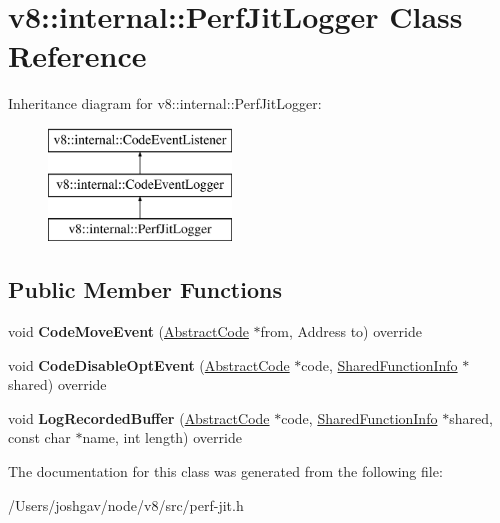 \hypertarget{classv8_1_1internal_1_1_perf_jit_logger}{}\section{v8\+:\+:internal\+:\+:Perf\+Jit\+Logger Class Reference}
\label{classv8_1_1internal_1_1_perf_jit_logger}
Inheritance diagram for v8\+:\+:internal\+:\+:Perf\+Jit\+Logger\+:\begin{figure}[H]
\begin{center}
\leavevmode
\includegraphics[height=3.000000cm]{classv8_1_1internal_1_1_perf_jit_logger}
\end{center}
\end{figure}
\subsection*{Public Member Functions}
\begin{DoxyCompactItemize}
\item 
void {\bfseries Code\+Move\+Event} (\hyperlink{classv8_1_1internal_1_1_abstract_code}{Abstract\+Code} $\ast$from, Address to) override\hypertarget{classv8_1_1internal_1_1_perf_jit_logger_aef5636f11061bd491c383c79e2bbc251}{}\label{classv8_1_1internal_1_1_perf_jit_logger_aef5636f11061bd491c383c79e2bbc251}

\item 
void {\bfseries Code\+Disable\+Opt\+Event} (\hyperlink{classv8_1_1internal_1_1_abstract_code}{Abstract\+Code} $\ast$code, \hyperlink{classv8_1_1internal_1_1_shared_function_info}{Shared\+Function\+Info} $\ast$shared) override\hypertarget{classv8_1_1internal_1_1_perf_jit_logger_a6f123b5a32feadca3635bf9fccf474cb}{}\label{classv8_1_1internal_1_1_perf_jit_logger_a6f123b5a32feadca3635bf9fccf474cb}

\item 
void {\bfseries Log\+Recorded\+Buffer} (\hyperlink{classv8_1_1internal_1_1_abstract_code}{Abstract\+Code} $\ast$code, \hyperlink{classv8_1_1internal_1_1_shared_function_info}{Shared\+Function\+Info} $\ast$shared, const char $\ast$name, int length) override\hypertarget{classv8_1_1internal_1_1_perf_jit_logger_a32c1a437102844b71d0420010aaced2a}{}\label{classv8_1_1internal_1_1_perf_jit_logger_a32c1a437102844b71d0420010aaced2a}

\end{DoxyCompactItemize}


The documentation for this class was generated from the following file\+:\begin{DoxyCompactItemize}
\item 
/\+Users/joshgav/node/v8/src/perf-\/jit.\+h\end{DoxyCompactItemize}
